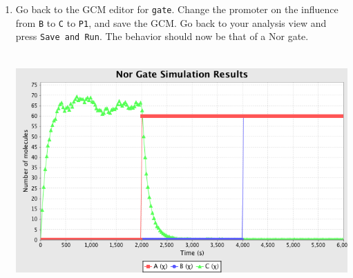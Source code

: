 \documentclass[titlepage,11pt]{article}
\begin{document}
\begin{enumerate}
\clearpage

\item Go back to the GCM editor for {\tt gate}.  Change the promoter
  on the influence from {\tt B} to {\tt C} to {\tt P1}, and save the
  GCM.  Go back to your analysis view and press {\tt Save and Run}.
  The behavior should now be that of a Nor gate.

\includegraphics[height=90mm]{screenshots/norResults}

\end{enumerate}
  
\end{document}
